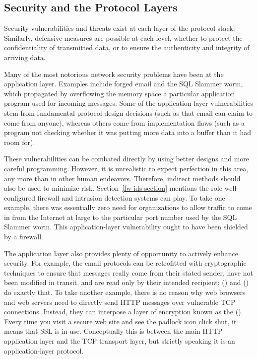 \subsection{Security and the Protocol Layers}

Security vulnerabilities and threats exist at each layer of the
protocol stack.  Similarly, defensive measures are possible at each
level, whether to protect the confidentiality of transmitted data, or
to ensure the authenticity and integrity of arriving data.

Many of the most notorious network security problems have been at the
application layer.  Examples include forged email and the SQL Slammer
worm, which propagated by overflowing the memory space a particular
application program used for incoming messages.  Some of the
application-layer vulnerabilities stem from fundamental protocol
design decisions (such as that email can claim to come from anyone),
whereas others come from implementation flaws (such as a program not
checking whether it was putting more data into a buffer than it had
room for).

These vulnerabilities can be combated directly by using better
designs and more careful programming.  However, it is unrealistic to
expect perfection in this area, any more than in other human
endeavors.  Therefore, indirect methods should also be used to
minimize risk.  Section~\ref{fw-ids-section} mentions the role
well-configured firewall and intrusion detection systems can play.  To
take one example, there was essentially zero need for organizations to
allow traffic to come in from the Internet at large to the particular
port number used by the SQL Slammer worm.  This application-layer
vulnerability ought to have been shielded by a firewall.

The application layer also provides plenty of opportunity to actively
enhance security.  For example, the email protocols can be retrofitted
with cryptographic techniques to ensure that messages really come from
their stated sender, have not been modified in transit, and are
read only by their intended recipient;  () and  () do
exactly that.  To take another example, there is no reason why web
browsers and web servers need to directly send HTTP messages over
vulnerable TCP connections.  Instead, they can interpose a layer of
encryption known as the  ().
Every time you visit a secure web site and see the padlock icon click
shut, it means that SSL is in use.  Conceptually this is between the
main HTTP application layer and the TCP transport layer, but strictly
speaking it is an application-layer protocol.


